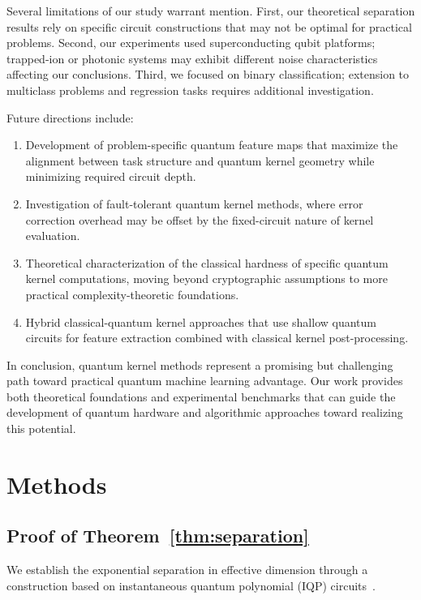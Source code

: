 \documentclass[aps,prb,reprint,superscriptaddress,showpacs]{revtex4-2}
\begin{document}
Several limitations of our study warrant mention. First, our theoretical separation results rely on specific circuit constructions that may not be optimal for practical problems. Second, our experiments used superconducting qubit platforms; trapped-ion or photonic systems may exhibit different noise characteristics affecting our conclusions. Third, we focused on binary classification; extension to multiclass problems and regression tasks requires additional investigation.

Future directions include:
\begin{enumerate}[label=(\roman*)]
    \item Development of problem-specific quantum feature maps that maximize the alignment between task structure and quantum kernel geometry while minimizing required circuit depth.
    \item Investigation of fault-tolerant quantum kernel methods, where error correction overhead may be offset by the fixed-circuit nature of kernel evaluation.
    \item Theoretical characterization of the classical hardness of specific quantum kernel computations, moving beyond cryptographic assumptions to more practical complexity-theoretic foundations.
    \item Hybrid classical-quantum kernel approaches that use shallow quantum circuits for feature extraction combined with classical kernel post-processing.
\end{enumerate}

In conclusion, quantum kernel methods represent a promising but challenging path toward practical quantum machine learning advantage. Our work provides both theoretical foundations and experimental benchmarks that can guide the development of quantum hardware and algorithmic approaches toward realizing this potential.


\section{Methods}
\label{sec:methods}

\subsection{Proof of Theorem~\ref{thm:separation}}

We establish the exponential separation in effective dimension through a construction based on instantaneous quantum polynomial (IQP) circuits~\cite{Bremner2016AverageCase}.
\end{document}
